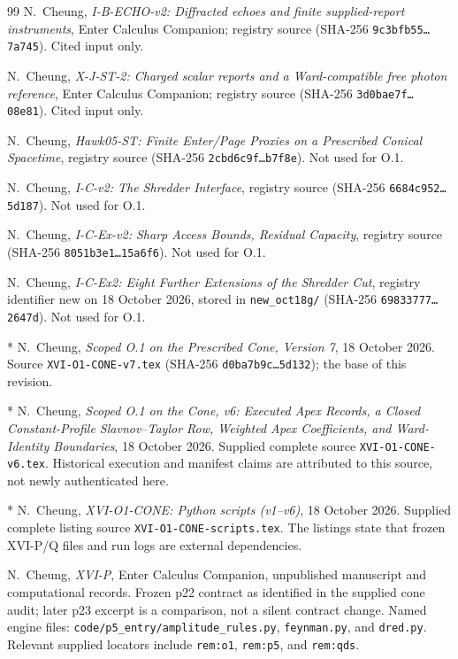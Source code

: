 \documentclass[11pt,a4paper]{article}
\newcommand{\loc}[1]{\nolinkurl{#1}}
\theoremstyle{plain}
\theoremstyle{definition}
\theoremstyle{remark}
\numberwithin{equation}{section}
\begin{document}
\begin{thebibliography}{99}
\ddag N.~Cheung,
\emph{I-B-ECHO-v2: Diffracted echoes and finite supplied-report
instruments}, Enter Calculus Companion; registry source
(SHA-256 \texttt{9c3bfb55\ldots7a745}). Cited input only.

\ddag N.~Cheung,
\emph{X-J-ST-2: Charged scalar reports and a Ward-compatible free
photon reference}, Enter Calculus Companion; registry source
(SHA-256 \texttt{3d0bae7f\ldots 08e81}). Cited input only.

\ddag N.~Cheung,
\emph{Hawk05-ST: Finite Enter/Page Proxies on a Prescribed Conical
Spacetime}, registry source (SHA-256 \texttt{2cbd6c9f\ldots b7f8e}).
Not used for O.1.

\ddag N.~Cheung,
\emph{I-C-v2: The Shredder Interface}, registry source
(SHA-256 \texttt{6684c952\ldots 5d187}). Not used for O.1.

\ddag N.~Cheung,
\emph{I-C-Ex-v2: Sharp Access Bounds, Residual Capacity}, registry
source (SHA-256 \texttt{8051b3e1\ldots 15a6f6}). Not used for O.1.

\ddag N.~Cheung,
\emph{I-C-Ex2: Eight Further Extensions of the Shredder Cut},
registry identifier new on 18 October 2026, stored in
\loc{new_oct18g/} (SHA-256 \texttt{69833777\ldots 2647d}).
Not used for O.1.

* N.~Cheung,
\emph{Scoped O.1 on the Prescribed Cone, Version 7},
18 October 2026. Source \loc{XVI-O1-CONE-v7.tex}
(SHA-256 \texttt{d0ba7b9c\ldots5d132}); the base of this revision.


* N.~Cheung,
\emph{Scoped O.1 on the Cone, v6:
Executed Apex Records, a Closed Constant-Profile
Slavnov--Taylor Row, Weighted Apex Coefficients,
and Ward-Identity Boundaries},
18 October 2026.
Supplied complete source \loc{XVI-O1-CONE-v6.tex}.
Historical execution and manifest claims are attributed to this
source, not newly authenticated here.

* N.~Cheung,
\emph{XVI-O1-CONE: Python scripts (v1--v6)},
18 October 2026.
Supplied complete listing source
\loc{XVI-O1-CONE-scripts.tex}.
The listings state that frozen XVI-P/Q files and run logs are
external dependencies.

\ddag N.~Cheung,
\emph{XVI-P},
Enter Calculus Companion, unpublished manuscript and computational
records.
Frozen p22 contract as identified in the supplied cone audit;
later p23 excerpt is a comparison, not a silent contract change.
Named engine files:
\loc{code/p5_entry/amplitude_rules.py},
\loc{feynman.py}, and \loc{dred.py}.
Relevant supplied locators include
\loc{rem:o1}, \loc{rem:p5}, and \loc{rem:qds}.


\end{thebibliography}
\end{document}
